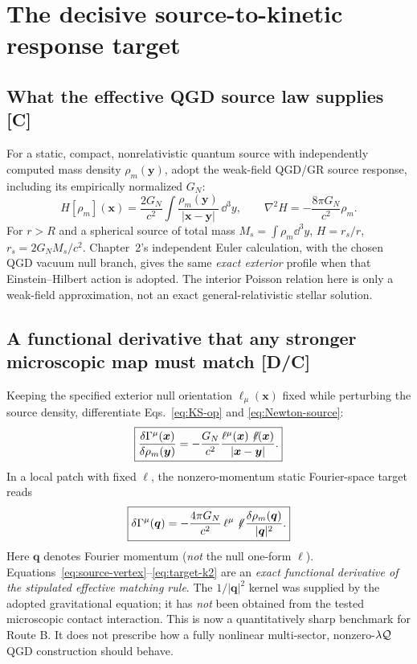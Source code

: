 \documentclass[11pt,a4paper]{article}
\begin{document}
\section{The decisive source-to-kinetic response target}\label{sec:target-kernel}
\subsection{What the effective QGD source law supplies [C]}
For a static, compact, nonrelativistic quantum source with independently computed mass density $\rho_m(\bm y)$, adopt the weak-field QGD/GR source response, including its empirically normalized $G_N$:
\begin{equation}\label{eq:Newton-source}
 \boxed{H[\rho_m](\bm x)=\frac{2G_N}{c^2}
 \int\frac{\rho_m(\bm y)}{|\bm x-\bm y|}\,\dd^3y,
 \qquad \nabla^2H=-\frac{8\pi G_N}{c^2}\rho_m.}
\end{equation}
For $r>R$ and a spherical source of total mass $M_s=\int\rho_m\dd^3y$, $H=r_s/r$, $r_s=2G_NM_s/c^2$. Chapter~2's independent Euler calculation, with the chosen QGD vacuum null branch, gives the same \emph{exact exterior} profile when that Einstein--Hilbert action is adopted. The interior Poisson relation here is only a weak-field approximation, not an exact general-relativistic stellar solution.

\subsection{A functional derivative that any stronger microscopic map must match [D/C]}
Keeping the specified exterior null orientation $\ell_\mu(\bm x)$ fixed while perturbing the source density, differentiate Eqs.~\eqref{eq:KS-op} and \eqref{eq:Newton-source}:
\begin{equation}\label{eq:source-vertex}
 \boxed{
 \frac{\delta\Gamma^\mu(\bm x)}{\delta\rho_m(\bm y)}
 =-\frac{G_N}{c^2}
 \frac{\ell^\mu(\bm x)\not\!\ell(\bm x)}{|\bm x-\bm y|}.}
\end{equation}
In a local patch with fixed $\ell$, the nonzero-momentum static Fourier-space target reads
\begin{equation}\label{eq:target-k2}
 \boxed{\delta\Gamma^\mu(\bm q)
 =-\frac{4\pi G_N}{c^2}\,
 \ell^\mu\not\!\ell\,
 \frac{\delta\rho_m(\bm q)}{|\bm q|^2}.}
\end{equation}
Here $\bm q$ denotes Fourier momentum (\emph{not} the null one-form $\ell$). Equations~\eqref{eq:source-vertex}--\eqref{eq:target-k2} are an \emph{exact functional derivative of the stipulated effective matching rule}. The $1/|\bm q|^2$ kernel was supplied by the adopted gravitational equation; it has \emph{not} been obtained from the tested microscopic contact interaction. This is now a quantitatively sharp benchmark for Route B. It does not prescribe how a fully nonlinear multi-sector, nonzero-$\lambda\mathcal Q$ QGD construction should behave.
\end{document}
